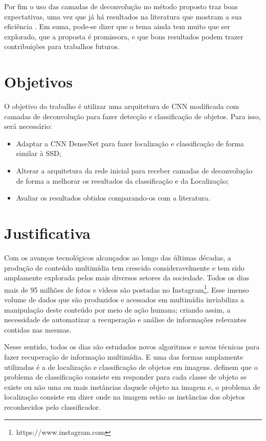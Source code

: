 Por fim o uso das camadas de deconvolução no método proposto traz boas expectativas, uma vez que já há resultados na literatura que mostram a sua eficiência \cite{noh:2015, cheng-2017}. Em suma, pode-se dizer que o tema ainda tem muito que ser explorado, que a proposta é promissora, e que bons resultados podem trazer contribuições para trabalhos futuros.

\section{Objetivos}
\label{secao:1:2}  

O objetivo do trabalho é utilizar uma arquitetura de \ac{CNN} modificada com camadas de deconvolução para fazer detecção e classificação de objetos. Para isso, será necessário:

\begin{itemize}
	\item Adaptar a \ac{CNN} \ac{DenseNet} \cite{liu-2017} para fazer localização e classificação de forma similar à \ac{SSD};
	\item Alterar a arquitetura da rede inicial para receber camadas de deconvolução de forma a melhorar os resultados da classificação e da Localização;
	\item Avaliar os resultados obtidos comparando-os com a literatura.
\end{itemize}

\section{Justificativa}
\label{secao:1:3}

Com os avanços tecnológicos alcançados ao longo das últimas décadas, a produção de conteúdo multimídia tem crescido consideravelmente e tem sido amplamente explorada pelos mais diversos setores da sociedade. Todos os dias mais de 95 milhões de fotos e vídeos são postadas no Instagram\footnote{https://www.instagram.com}. Esse imenso volume de dados que são produzidos e acessados em multimídia inviabiliza a manipulação deste conteúdo por meio de ação humana; criando assim, a necessidade de automatizar a recuperação e análise de informações relevantes contidas nas mesmas.

Nesse sentido, todos os dias são estudados novos algoritmos e novas técnicas para fazer recuperação de informação multimídia. E uma das formas amplamente utilizadas é a de localização e classificação de objetos em imagens.  definem que o problema de classificação consiste em responder para cada classe de objeto se existe ou não uma ou mais instâncias daquele objeto na imagem e, o problema de localização consiste em dizer onde na imagem estão as instâncias dos objetos reconhecidos pelo classificador.

